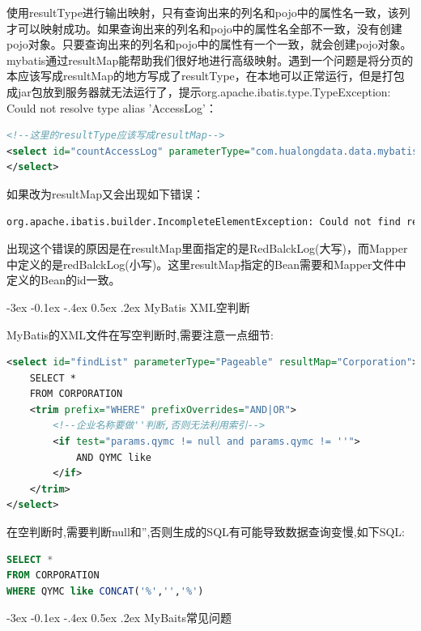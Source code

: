 \documentclass[12pt]{book}
\makeatletter
\numberwithin{dummy}{section}
\theoremstyle{ocrenumbox}
\theoremstyle{blacknumex}
\theoremstyle{blacknumbox}
\theoremstyle{ocrenum}
\renewcommand{\subsection}{\@startsection {subsection}{2}{\z@}
	{-3ex \@plus -0.1ex \@minus -.4ex}
	{0.5ex \@plus.2ex }
	{\normalfont\sffamily\bfseries}}
\makeatother
\begin{document}
使用resultType进行输出映射，只有查询出来的列名和pojo中的属性名一致，该列才可以映射成功。如果查询出来的列名和pojo中的属性名全部不一致，没有创建pojo对象。只要查询出来的列名和pojo中的属性有一个一致，就会创建pojo对象。mybatis通过resultMap能帮助我们很好地进行高级映射。遇到一个问题是将分页的本应该写成resultMap的地方写成了resultType，在本地可以正常运行，但是打包成jar包放到服务器就无法运行了，提示org.apache.ibatis.type.TypeException: Could not resolve type alias 'AccessLog'：

\begin{lstlisting}[language=XML]
<!--这里的resultType应该写成resultMap-->
<select id="countAccessLog" parameterType="com.hualongdata.data.mybatis.Pageable" resultType="AccessLog">
</select>
\end{lstlisting}

如果改为resultMap又会出现如下错误：


\begin{lstlisting}[language=XML]
org.apache.ibatis.builder.IncompleteElementException: Could not find result map creditsystem.data.mapper.RedBalckLogMapper.RedBalckLog
\end{lstlisting}

出现这个错误的原因是在resultMap里面指定的是RedBalckLog(大写)，而Mapper中定义的是redBalckLog(小写)。这里resultMap指定的Bean需要和Mapper文件中定义的Bean的id一致。

\subsection{MyBatis XML空判断}

MyBatis的XML文件在写空判断时,需要注意一点细节:


\begin{lstlisting}[language=XML]
<select id="findList" parameterType="Pageable" resultMap="Corporation">
	SELECT *
	FROM CORPORATION
	<trim prefix="WHERE" prefixOverrides="AND|OR">
		<!--企业名称要做''判断,否则无法利用索引-->
		<if test="params.qymc != null and params.qymc != ''">
			AND QYMC like 
		</if>
	</trim>
</select>
\end{lstlisting}

在空判断时,需要判断null和'',否则生成的SQL有可能导致数据查询变慢,如下SQL:

\begin{lstlisting}[language=SQL]
SELECT *
FROM CORPORATION
WHERE QYMC like CONCAT('%','','%')
\end{lstlisting}

\subsection{MyBaits常见问题}
\end{document}
